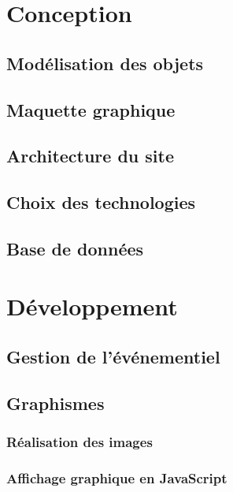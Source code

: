 \documentclass[12pt]{report}
\begin{document}
\chapter{Conception}
    
    \section{Modélisation des objets}
    
    \section{Maquette graphique}
    
    \section{Architecture du site}
    
    \section{Choix des technologies}
    
    \section{Base de données}
    
\chapter{Développement}
    
    \section{Gestion de l'événementiel}
    
    \section{Graphismes}
        
        \subsection{Réalisation des images}
        
        \subsection{Affichage graphique en JavaScript}
    
\end{document}
